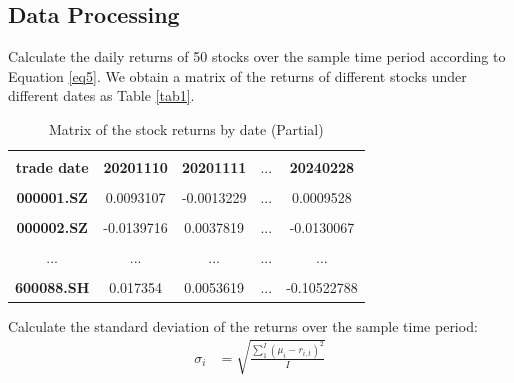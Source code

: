 \documentclass[default,iicol]{sn-jnl}%
\begin{document}
\subsection{Data Processing}\label{sec4sub2}
\hspace{1.5em}Calculate the daily returns of 50 stocks over the sample time period according to Equation \eqref{eq5}. We obtain a matrix of the returns of different stocks under different dates as Table \eqref{tab1}.
\begin{table}[htbp]
	\centering  
	\begin{tabular}{|c|c|c|c|c|}  
		\hline  %
		& & & &\\[-6pt]  %
		\textbf{trade date}&\textbf{20201110}&\textbf{20201111}&...&\textbf{20240228} \\  
		\hline
		& & & & \\[-6pt]
		\textbf{000001.SZ}&0.0093107&-0.0013229&...&0.0009528 \\
		\hline
			& & & & \\[-6pt]
		\textbf{000002.SZ}&-0.0139716&0.0037819&...&-0.0130067 \\
		\hline
		& & & & \\[-6pt]
		...&...&...&...&... \\
		\hline
		& & & & \\[-6pt]
		\textbf{600088.SH}&0.017354&0.0053619&...&-0.10522788 \\
		\hline
	\end{tabular}
\caption{Matrix of the stock returns by date (Partial)} 
\label{tab1}
\end{table}

Calculate the standard deviation of the returns over the sample time period:
\begin{align}
	\sigma _{i} & = \sqrt{\frac{\sum_{1}^{I} (\mu_{i}-r_{i,t})^2}{I} } 
	\label{eq6}
\end{align}
\end{document}
